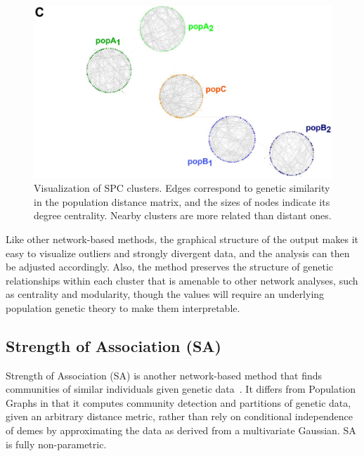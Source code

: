 \documentclass{essay}
\begin{document}
\begin{figure}
  \includegraphics[width=1\linewidth,keepaspectratio]{../Figures/fig6c.png}
  \caption{Visualization of SPC clusters. Edges correspond to genetic
    similarity in the population distance matrix, and the sizes of nodes
    indicate its degree centrality. Nearby clusters are more related than
    distant ones\cite{neuditschko_netview:_2012}.}
\end{figure}

Like other network-based methods, the graphical structure of the output makes
it easy to visualize outliers and strongly divergent data, and the analysis can
then be adjusted accordingly. Also, the method preserves the structure of
genetic relationships within each cluster that is amenable to other network
analyses, such as centrality and modularity, though the values will require an
underlying population genetic theory to make them interpretable.

\subsection{Strength of Association (SA)}

Strength of Association (SA) is another network-based method that finds
communities of similar individuals given genetic
data~\cite{greenbaum_inference_2016}. It differs from Population Graphs in that
it computes community detection and partitions of genetic data, given an
arbitrary distance metric, rather than rely on conditional independence of
demes by approximating the data as derived from a multivariate Gaussian. SA is
fully non-parametric.
\end{document}
